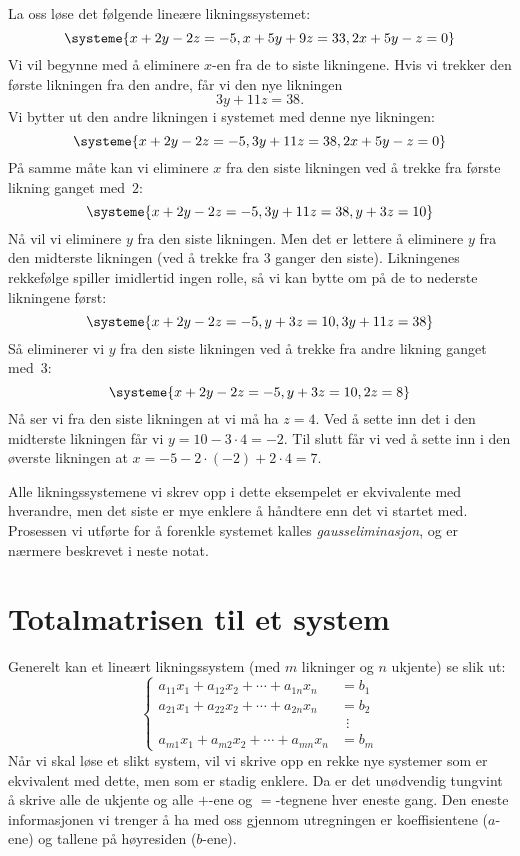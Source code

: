 \begin{ex}
\label{ex:gausseliminasjon}
La oss løse det følgende lineære likningssystemet:
\[
\systeme{
   x + 2y - 2z = -5,
   x + 5y + 9z = 33,
  2x + 5y -  z = 0
}
\]
Vi vil begynne med å eliminere $x$-en fra de to siste likningene.
Hvis vi trekker den første likningen fra den andre, får vi den nye
likningen
\[
3y + 11z = 38.
\]
Vi bytter ut den andre likningen i systemet med denne nye likningen:
\[
\systeme{
   x + 2y -  2z = -5,
       3y + 11z = 38,
  2x + 5y -   z = 0
}
\]
På samme måte kan vi eliminere $x$ fra den siste likningen ved å
trekke fra første likning ganget med~$2$:
\[
\systeme{
   x + 2y -  2z = -5,
       3y + 11z = 38,
        y +  3z = 10
}
\]
Nå vil vi eliminere $y$ fra den siste likningen.  Men det er lettere å
eliminere $y$ fra den midterste likningen (ved å trekke fra $3$ ganger den
siste).  Likningenes rekkefølge spiller imidlertid ingen rolle, så vi
kan bytte om på de to nederste likningene først:
\[
\systeme{
   x + 2y -  2z = -5,
        y +  3z = 10,
       3y + 11z = 38
}
\]
Så eliminerer vi $y$ fra den siste likningen ved å trekke fra andre
likning ganget med~$3$:
\[
\systeme{
   x + 2y - 2z = -5,
        y + 3z = 10,
            2z =  8
}
\]
Nå ser vi fra den siste likningen at vi må ha $z = 4$.  Ved å sette
inn det i den midterste likningen får vi $y = 10 - 3 \cdot 4 = -2$.
Til slutt får vi ved å sette inn i den øverste likningen at
$x = -5 - 2 \cdot (-2) + 2 \cdot 4 = 7$.
\end{ex}

Alle likningssystemene vi skrev opp i dette eksempelet er ekvivalente
med hverandre, men det siste er mye enklere å håndtere enn det vi
startet med.  Prosessen vi utførte for å forenkle systemet kalles
\emph{gauss\-eliminasjon}, og er nærmere beskrevet i neste notat.


\section*{Totalmatrisen til et system}

Generelt kan et lineært likningssystem (med $m$ likninger og $n$
ukjente) se slik ut:
\[
\left\{
\begin{aligned}
  a_{11} x_1 + a_{12} x_2 + \cdots + a_{1n} x_n &= b_1 \\
  a_{21} x_1 + a_{22} x_2 + \cdots + a_{2n} x_n &= b_2 \\
                                                &\ \ \vdots \\
  a_{m1} x_1 + a_{m2} x_2 + \cdots + a_{mn} x_n &= b_m
\end{aligned}
\right.
\]
Når vi skal løse et slikt system, vil vi skrive opp en rekke nye
systemer som er ekvivalent med dette, men som er stadig enklere.  Da
er det unødvendig tungvint å skrive alle de ukjente og alle $+$-ene og
$=$-tegnene hver eneste gang.  Den eneste informasjonen vi trenger å
ha med oss gjennom utregningen er koeffisientene ($a$-ene) og tallene
på høyresiden ($b$-ene).

